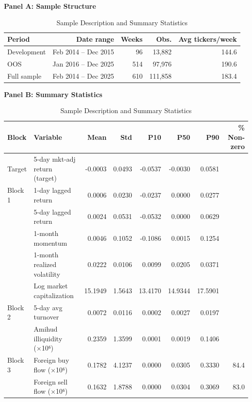 \begin{table}[ht]
\centering
\small
\caption{Sample Description and Summary Statistics}
\label{tab:descriptive}
\vspace{0.5em}
\textbf{Panel A: Sample Structure}
\vspace{0.3em}
\begin{tabular}{lrrrr}
\toprule
Period & Date range & Weeks & Obs. & Avg tickers/week \\
\midrule
Development & Feb 2014 – Dec 2015 & 96 & 13,882 & 144.6 \\
OOS & Jan 2016 – Dec 2025 & 514 & 97,976 & 190.6 \\
Full sample & Feb 2014 – Dec 2025 & 610 & 111,858 & 183.4 \\
\bottomrule
\end{tabular}
\vspace{1em}
\textbf{Panel B: Summary Statistics}
\vspace{0.3em}
\begin{tabular}{llrrrrrr}
\toprule
Block & Variable & Mean & Std & P10 & P50 & P90 & \% Non-zero \\
\midrule
Target & 5-day mkt-adj return (target) & -0.0003 & 0.0493 & -0.0537 & -0.0030 & 0.0581 &  \\
Block 1 & 1-day lagged return & 0.0006 & 0.0230 & -0.0237 & 0.0000 & 0.0277 &  \\
 & 5-day lagged return & 0.0024 & 0.0531 & -0.0532 & 0.0000 & 0.0629 &  \\
 & 1-month momentum & 0.0046 & 0.1052 & -0.1086 & 0.0015 & 0.1254 &  \\
 & 1-month realized volatility & 0.0222 & 0.0106 & 0.0099 & 0.0205 & 0.0371 &  \\
 & Log market capitalization & 15.1949 & 1.5643 & 13.4170 & 14.9344 & 17.5901 &  \\
Block 2 & 5-day avg turnover & 0.0072 & 0.0116 & 0.0002 & 0.0027 & 0.0197 &  \\
 & Amihud illiquidity (×10⁶) & 0.2359 & 1.3599 & 0.0001 & 0.0019 & 0.1406 &  \\
Block 3 & Foreign buy flow (×10⁶) & 0.1782 & 4.1237 & 0.0000 & 0.0305 & 0.3330 & 84.4 \\
 & Foreign sell flow (×10⁶) & 0.1632 & 1.8788 & 0.0000 & 0.0304 & 0.3069 & 83.0 \\
\bottomrule
\end{tabular}
\vspace{0.5em}
\begin{minipage}{0.95\textwidth}
\footnotesize

\end{minipage}
\end{table}
